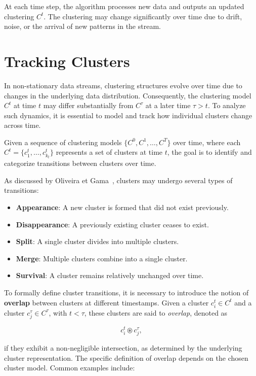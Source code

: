 At each time step, the algorithm processes new data and outputs an updated
clustering $C^t$. The clustering may change significantly over time due to
drift, noise, or the arrival of new patterns in the stream.

\section{Tracking Clusters}\label{sec:prob_tracking_clusters}
In non-stationary data streams, clustering structures evolve over time due to
changes in the underlying data distribution. Consequently, the clustering model
$C^t$ at time $t$ may differ substantially from $C^\tau$ at a later time $\tau
    > t$. To analyze such dynamics, it is essential to model and track how
individual clusters change across time.

Given a sequence of clustering models $\{C^0, C^1, \dots, C^T\}$ over time,
where each $C^t = \{c_1^t, \dots, c_{k_t}^t\}$ represents a set of clusters at
time $t$, the goal is to identify and categorize transitions between clusters
over time.

As discussed by Oliveira et Gama~\cite{mec}, clusters may undergo several types
of transitions:

\begin{itemize}
    \item \textbf{Appearance}: A new cluster is formed that did not exist previously.
    \item \textbf{Disappearance}: A previously existing cluster ceases to exist.
    \item \textbf{Split}: A single cluster divides into multiple clusters.
    \item \textbf{Merge}: Multiple clusters combine into a single cluster.
    \item \textbf{Survival}: A cluster remains relatively unchanged over time.
\end{itemize}

To formally define cluster transitions, it is necessary to introduce the notion
of \textbf{overlap} between clusters at different timestamps. Given a cluster $
    c_i^t \in C^t $ and a cluster $ c_j^\tau \in C^\tau $, with $ t < \tau $, these
clusters are said to \emph{overlap}, denoted as

\begin{equation}
    c_i^t \circledast c_j^\tau,
\end{equation}

if they exhibit a non-negligible intersection, as determined by the underlying
cluster representation. The specific definition of overlap depends on the
chosen cluster model. Common examples include:

